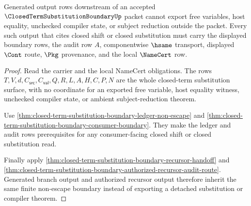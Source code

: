 \begin{theorem}
\label{thm:closed-term-substitution-boundary-output-nonescape}
Generated output rows downstream of an accepted $\ClosedTermSubstitutionBoundaryUp$ packet cannot export free variables, host equality, unchecked compiler state, or subject reduction outside the packet. Every such output that cites closed shift or closed substitution must carry the displayed boundary rows, the audit row $A$, componentwise $\hsame$ transport, displayed $\Cont$ route, $\Pkg$ provenance, and the local $\NameCert$ row.
\end{theorem}
\begin{proof}
Read the carrier and the local NameCert obligations. The rows $T,V,d,C_{\mathsf{src}},C_{\mathsf{val}},Q,R,L,A,H,C,P,N$ are the whole closed-term substitution surface, with no coordinate for an exported free variable, host equality witness, unchecked compiler state, or ambient subject-reduction theorem.

Use \autoref{thm:closed-term-substitution-boundary-ledger-non-escape} and \autoref{thm:closed-term-substitution-boundary-consumer-boundary}. They make the ledger and audit rows prerequisites for any consumer-facing closed shift or closed substitution read.

Finally apply \autoref{thm:closed-term-substitution-boundary-recursor-handoff} and \autoref{thm:closed-term-substitution-boundary-authorized-recursor-audit-route}. Generated branch output and authorized recursor output therefore inherit the same finite non-escape boundary instead of exporting a detached substitution or compiler theorem.
\end{proof}

